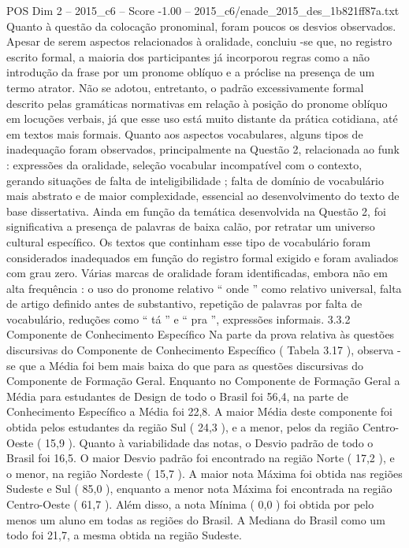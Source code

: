 \begin{textsample}{POS Dim 2 – 2015\_c6 – Score -1.00 – 2015\_c6/enade\_2015\_des\_1b821ff87a.txt}
Quanto à questão da colocação pronominal, foram poucos os desvios observados.
Apesar de serem aspectos relacionados à oralidade, concluiu -se que, no registro escrito formal, a maioria dos participantes já incorporou regras como a não introdução da frase por um pronome oblíquo e a próclise na presença de um termo atrator.
Não se adotou, entretanto, o padrão excessivamente formal descrito pelas gramáticas normativas em relação à posição do pronome oblíquo em locuções verbais, já que esse uso está muito distante da prática cotidiana, até em textos mais formais.
Quanto aos aspectos vocabulares, alguns tipos de inadequação foram observados, principalmente na Questão 2, relacionada ao funk : expressões da oralidade, seleção vocabular incompatível com o contexto, gerando situações de falta de inteligibilidade ; falta de domínio de vocabulário mais abstrato e de maior complexidade, essencial ao desenvolvimento do texto de base dissertativa.
Ainda em função da temática desenvolvida na Questão 2, foi significativa a presença de palavras de baixa calão, por retratar um universo cultural específico.
Os textos que continham esse tipo de vocabulário foram considerados inadequados em função do registro formal exigido e foram avaliados com grau zero.
Várias marcas de oralidade foram identificadas, embora não em alta frequência : o uso do pronome relativo “ onde ” como relativo universal, falta de artigo definido antes de substantivo, repetição de palavras por falta de vocabulário, reduções como “ tá ” e “ pra ”, expressões informais. 3.3.2 Componente de Conhecimento Específico Na parte da prova relativa às questões discursivas do Componente de Conhecimento Específico ( Tabela 3.17 ), observa -se que a Média foi bem mais baixa do que para as questões discursivas do Componente de Formação Geral.
Enquanto no Componente de Formação Geral a Média para estudantes de Design de todo o Brasil foi 56,4, na parte de Conhecimento Específico a Média foi 22,8.
A maior Média deste componente foi obtida pelos estudantes da região Sul ( 24,3 ), e a menor, pelos da região Centro-Oeste ( 15,9 ).
Quanto à variabilidade das notas, o Desvio padrão de todo o Brasil foi 16,5.
O maior Desvio padrão foi encontrado na região Norte ( 17,2 ), e o menor, na região Nordeste ( 15,7 ).
A maior nota Máxima foi obtida nas regiões Sudeste e Sul ( 85,0 ), enquanto a menor nota Máxima foi encontrada na região Centro-Oeste ( 61,7 ).
Além disso, a nota Mínima ( 0,0 ) foi obtida por pelo menos um aluno em todas as regiões do Brasil.
A Mediana do Brasil como um todo foi 21,7, a mesma obtida na região Sudeste.

\end{textsample}
